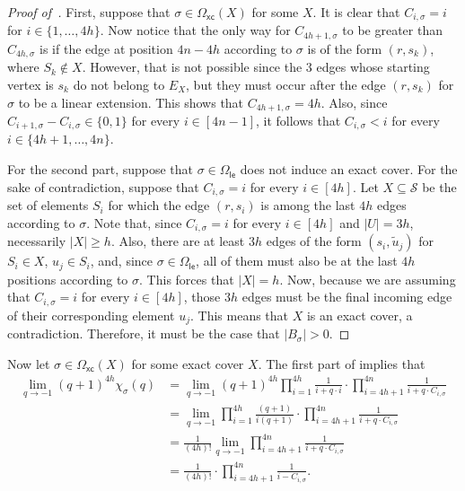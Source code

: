\documentclass[11pt]{amsart}
\newcommand{\ns}{s}
\newcommand{\nou}{\tilde{u}}
\newcommand{\omxc}{\Omega_{\mathsf{xc}}}
\newcommand{\omle}{\Omega_{\mathsf{le}}}
\begin{document}
\begin{proof}[Proof of~]
First, suppose that $\sigma \in \omxc(X)$ for some $X$. It is clear that $C_{i, \sigma} = i$ for $i \in \{1, \dots, 4h\}$. Now notice that the only way for $C_{4h+1, \sigma}$ to be greater than $C_{4h, \sigma}$ is if the edge at position $4n-4h$ according to $\sigma$ is of the form $(r, \ns_k)$, where $S_k \notin X$. However, that is not possible since the $3$ edges whose starting vertex is $\ns_k$ do not belong to $E_X$, but they must occur after the edge $(r, \ns_k)$ for $\sigma$ to be a linear extension. This shows that $C_{4h+1, \sigma} = 4h$. Also, since $C_{i+1, \sigma} - C_{i, \sigma} \in \{0, 1\}$ for every $i \in [4n-1]$, it follows that $C_{i, \sigma} < i$ for every $i \in \{4h+1, \dots, 4n\}$.

For the second part, suppose that $\sigma \in \omle$ does not induce an exact cover. For the sake of contradiction, suppose that $C_{i, \sigma} = i$ for every $i \in [4h]$. 
Let $X \subseteq \mathcal{S}$ be the set of elements $S_i$ for which the edge $(r, s_i)$ is among the last $4h$ edges according to $\sigma$. Note that, since $C_{i, \sigma} = i$ for every $i \in [4h]$ and $|U| = 3h$, necessarily $|X| \geq h$. Also, there are at least $3h$ edges of the form $(\ns_i, \nou_j)$ for $S_i \in X$, $u_j \in S_i$, and, since $\sigma \in \omle$, all of them must also be at the last $4h$ positions according to $\sigma$. This forces that $|X| = h$. Now, because we are assuming that $C_{i, \sigma} = i$ for every $i \in [4h]$, those $3h$ edges must be the final incoming edge of their corresponding element $u_j$. This means that $X$ is an exact cover, a contradiction. Therefore, it must be the case that $|B_\sigma| > 0$.

\end{proof}

Now let $\sigma \in \omxc(X)$ for some exact cover $X$. The first part of  implies that
\begin{align*}
     \lim_{q \to -1} (q+1)^{4h}\chi_{\sigma}(q) &= \lim_{q \to -1}  (q+1)^{4h} \prod_{i=1}^{4h} \frac{1}{i + q\cdot i }  \cdot \prod_{i=4h+1}^{4n} \frac{1}{i + q\cdot C_{i, \sigma} }\\
     &= \lim_{q \to -1}   \prod_{i=1}^{4h} \frac{(q+1)}{i(q+1)}  \cdot \prod_{i=4h+1}^{4n} \frac{1}{i + q\cdot C_{i, \sigma} }\\
     &= \frac{1}{(4h)!} \lim_{q \to -1}  \prod_{i=4h+1}^{4n} \frac{1}{i + q\cdot C_{i, \sigma} }\\
     &= \frac{1}{(4h)!} \cdot \prod_{i=4h+1}^{4n} \frac{1}{i - C_{i, \sigma}}.
\end{align*}
\end{document}
